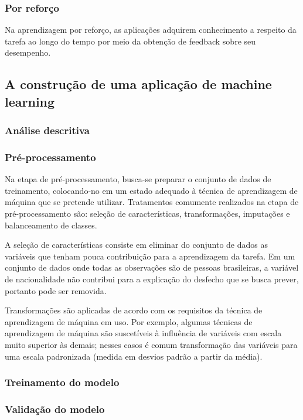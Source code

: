 \subsubsection{Por reforço}
Na aprendizagem por reforço, as aplicações adquirem conhecimento a respeito da tarefa ao longo do tempo por meio da obtenção
de feedback sobre seu desempenho.

\subsection{A construção de uma aplicação de machine learning}
\subsubsection{Análise descritiva}
\subsubsection{Pré-processamento}
Na etapa de pré-processamento, busca-se preparar o conjunto de dados de treinamento, colocando-no em um estado adequado à técnica
de aprendizagem de máquina que se pretende utilizar. Tratamentos comumente realizados na etapa de pré-processamento são: seleção de
características, transformações, imputações e balanceamento de classes.

A seleção de características consiste em eliminar do conjunto de dados as variáveis que tenham pouca contribuição para a aprendizagem da tarefa.
Em um conjunto de dados onde todas as observações são de pessoas brasileiras, a variável de nacionalidade não contribui para a explicação do desfecho
que se busca prever, portanto pode ser removida.

Transformações são aplicadas de acordo com os requisitos da técnica de aprendizagem de máquina em uso. Por exemplo, algumas técnicas de aprendizagem
de máquina são suscetíveis à influência de variáveis com escala muito superior às demais; nesses casos é comum transformação das variáveis para uma escala
padronizada (medida em desvios padrão a partir da média).

\subsubsection{Treinamento do modelo}
\subsubsection{Validação do modelo}
